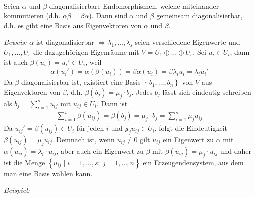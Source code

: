 \begin{mysatz}\ \\
    Seien $\alpha$ und $\beta$ diagonalisierbare Endomorphismen, welche miteinander kommutieren (d.h. $\alpha\beta = \beta\alpha$). Dann sind $\alpha$ und $\beta$ gemeinsam diagonalisierbar, d.h. es gibt eine Basis aus Eigenvektoren von $\alpha$ und $\beta$.

    \textit{Beweis:}
    $\alpha$ ist diagonalisierbar $\Rightarrow \lambda_1,\ldots,\lambda_s$ seien verschiedene Eigenwerte und $U_1,\ldots,U_s$ die dazugehörigen Eigenräume mit $V = U_1 \oplus \ldots \oplus U_s$.
    Sei $u_i\in U_i$, dann ist auch $\beta(u_i)=u_i'\in U_i$, weil
    \begin{align*}
        \alpha(u_i')= \alpha(\beta(u_i)) = \beta\alpha(u_i) = \beta \lambda_i u_i = \lambda_i u_i'
    \end{align*}
    Da $\beta$ diagonalisierbar ist, existiert eine Basis $\left\{ b_1,\ldots,b_n \right\}$ von $V$ aus Eigenvektoren von $\beta$, d.h. $\beta(b_j)=\mu_j\cdot b_j$. Jedes $b_j$ lässt sich eindeutig schreiben als $b_j=\sum\limits_{i=1}^s u_{ij}$ mit $u_{ij}\in U_i.$ Dann ist
    \begin{align*}
        \sum_{i=1}^s \beta(u_{ij}) = \beta(b_j)=\mu_j\cdot b_j = \sum_{i=1}^s\mu_j u_{ij}
    \end{align*}
    Da $u_{ij}' = \beta(u_{ij}) \in U_i$ für jeden $i$ und $\mu_ju_{ij} \in U_i$, folgt die Eindeutigkeit $\beta(u_{ij}) = \mu_j u_{ij}$. Demnach ist, wenn $u_{ij}\neq0$ gilt $u_{ij}$ ein Eigenwert zu $\alpha$ mit $\alpha(u_{ij}) = \lambda_i \cdot u_{ij}$, aber auch ein Eigenwert zu $\beta$ mit $\beta(u_{ij})=\mu_j\cdot u_{ij}$ und daher ist die Menge $\left\{ u_{ij} \mid i = 1,\ldots,s;\ j = 1,\ldots,n \right\}$ ein Erzeugendensystem, aus dem man eine Basis wählen kann.
\end{mysatz}

\textit{Beispiel:}

